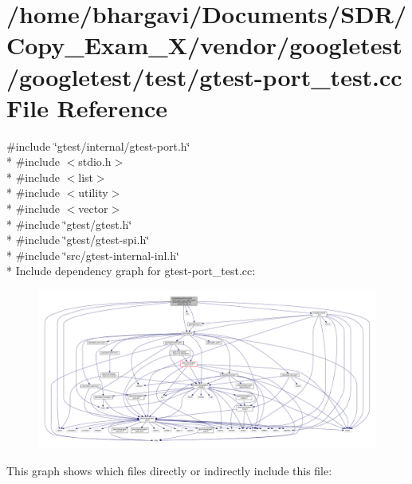 \hypertarget{gtest-port__test_8cc}{}\section{/home/bhargavi/\+Documents/\+S\+D\+R/\+Copy\+\_\+\+Exam\+\_\+X/vendor/googletest/googletest/test/gtest-\/port\+\_\+test.cc File Reference}
\label{gtest-port__test_8cc}
{\ttfamily \#include \char`\"{}gtest/internal/gtest-\/port.\+h\char`\"{}}\\*
{\ttfamily \#include $<$stdio.\+h$>$}\\*
{\ttfamily \#include $<$list$>$}\\*
{\ttfamily \#include $<$utility$>$}\\*
{\ttfamily \#include $<$vector$>$}\\*
{\ttfamily \#include \char`\"{}gtest/gtest.\+h\char`\"{}}\\*
{\ttfamily \#include \char`\"{}gtest/gtest-\/spi.\+h\char`\"{}}\\*
{\ttfamily \#include \char`\"{}src/gtest-\/internal-\/inl.\+h\char`\"{}}\\*
Include dependency graph for gtest-\/port\+\_\+test.cc\+:
\nopagebreak
\begin{figure}[H]
\begin{center}
\leavevmode
\includegraphics[width=350pt]{gtest-port__test_8cc__incl}
\end{center}
\end{figure}
This graph shows which files directly or indirectly include this file\+:
\nopagebreak
